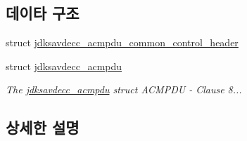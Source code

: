 \subsection*{데이타 구조}
\begin{DoxyCompactItemize}
\item 
struct \hyperlink{structjdksavdecc__acmpdu__common__control__header}{jdksavdecc\+\_\+acmpdu\+\_\+common\+\_\+control\+\_\+header}
\item 
struct \hyperlink{structjdksavdecc__acmpdu}{jdksavdecc\+\_\+acmpdu}
\begin{DoxyCompactList}\small\item\em The \hyperlink{structjdksavdecc__acmpdu}{jdksavdecc\+\_\+acmpdu} struct A\+C\+M\+P\+DU -\/ Clause 8... \end{DoxyCompactList}\end{DoxyCompactItemize}


\subsection{상세한 설명}
